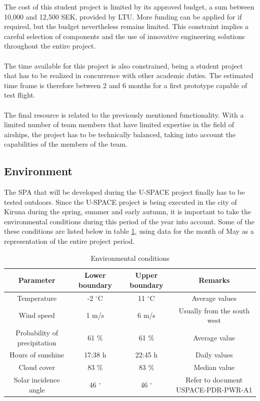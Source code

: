 \noindent
The cost of this student project is limited by its approved budget, a sum between 10,000 and 12,500 SEK, provided by \ac{LTU}. More funding can be applied for if required, but the budget nevertheless remains limited. This constraint implies a careful selection of components and the use of innovative engineering solutions throughout the entire project. 
\\
\\
The time available for this project is also constrained, being a student project that has to be realized in concurrence with other academic duties. The estimated time frame is therefore between 2 and 6 months for a first prototype capable of test flight.
\\
\\
The final resource is related to the previously mentioned functionality. With a limited number of team members that have limited expertise in the field of airships, the project has to be technically balanced, taking into account the capabilities of the members of the team.

\subsection{Environment}

The \ac{SPA} that will be developed during the \ac{U-SPACE} project finally has to be tested outdoors. Since the \ac{U-SPACE} project is being executed in the city of Kiruna during the spring, summer and early autumn, it is important to take the environmental conditions during this period of the year into account.  Some of the these conditions are listed below in table \ref{tab:environment}, using data for the month of May \cite{website:weatherspark} as a representation of the entire project period.

\begin{table}[H]
\centering
\caption{Environmental conditions}
\label{tab:environment}
\begin{tabular}{c c c c}
\hline
\textbf{Parameter} & \textbf{Lower boundary} & \textbf{Upper boundary} & \textbf{Remarks}\\ \hline
Temperature & -2 $^\circ$C & 11 $^\circ$C & Average values\\
Wind speed & 1 m/s & 6 m/s & Usually from the south west\\
Probability of precipitation & 61 \% & 61 \% & Average value\\
Hours of sunshine & 17:38 h & 22:45 h & Daily values\\
Cloud cover & 83 \% & 83 \% & Median value\\
Solar incidence angle & 46 $^\circ$ & 46 $^\circ$ & Refer to document USPACE-PDR-PWR-A1\\
\hline
\end{tabular}
\end{table}

